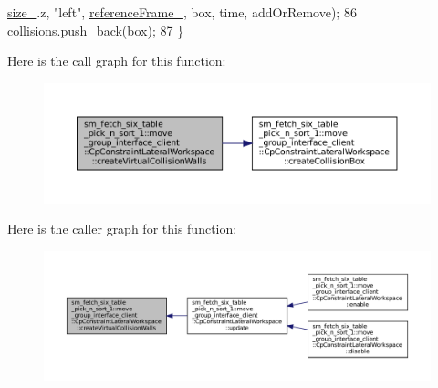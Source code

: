\begin{DoxyCode}
      \hyperlink{classsm__fetch__six__table__pick__n__sort__1_1_1move__group__interface__client_1_1CpConstraintLateralWorkspace_abcbeb3207f5e30503b9422654a3ec773}{size\_}.z, \textcolor{stringliteral}{"left"}, \hyperlink{classsm__fetch__six__table__pick__n__sort__1_1_1move__group__interface__client_1_1CpConstraintLateralWorkspace_a00a2521553405d97ad2ff89aefd777cf}{referenceFrame\_}, box, time, addOrRemove);
86             collisions.push\_back(box);
87         \}
\end{DoxyCode}
Here is the call graph for this function\+:
\nopagebreak
\begin{figure}[H]
\begin{center}
\leavevmode
\includegraphics[width=350pt]{classsm__fetch__six__table__pick__n__sort__1_1_1move__group__interface__client_1_1CpConstraintLateralWorkspace_a19423677db3f855f172e4fe614f826a2_cgraph}
\end{center}
\end{figure}
Here is the caller graph for this function\+:
\nopagebreak
\begin{figure}[H]
\begin{center}
\leavevmode
\includegraphics[width=350pt]{classsm__fetch__six__table__pick__n__sort__1_1_1move__group__interface__client_1_1CpConstraintLateralWorkspace_a19423677db3f855f172e4fe614f826a2_icgraph}
\end{center}
\end{figure}
\mbox{\label{classsm__fetch__six__table__pick__n__sort__1_1_1move__group__interface__client_1_1CpConstraintLateralWorkspace_a1a82a0d6e823971f194411d10b5fd6fb}} 
